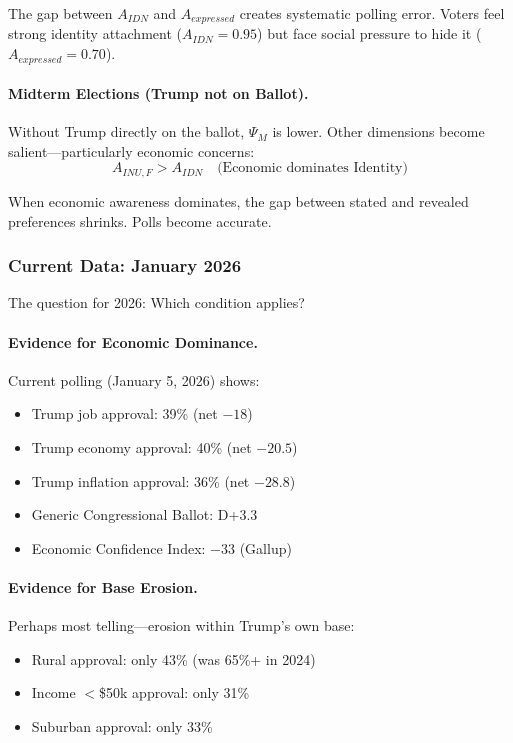The gap between $A_{IDN}$ and $A_{expressed}$ creates systematic polling 
error. Voters feel strong identity attachment ($A_{IDN} = 0.95$) but face 
social pressure to hide it ($A_{expressed} = 0.70$).

\paragraph{Midterm Elections (Trump not on Ballot).}
Without Trump directly on the ballot, $\Psi_M$ is lower. Other dimensions 
become salient---particularly economic concerns:
\begin{equation}
A_{INU,F} > A_{IDN} \quad \text{(Economic dominates Identity)}
\end{equation}

When economic awareness dominates, the gap between stated and revealed 
preferences shrinks. Polls become accurate.

\subsubsection{Current Data: January 2026}

The question for 2026: Which condition applies?

\paragraph{Evidence for Economic Dominance.}
Current polling (January 5, 2026) shows:

\begin{itemize}
    \item Trump job approval: 39\% (net $-18$)
    \item Trump economy approval: 40\% (net $-20.5$)
    \item Trump inflation approval: 36\% (net $-28.8$)
    \item Generic Congressional Ballot: D+3.3
    \item Economic Confidence Index: $-33$ (Gallup)
\end{itemize}

\paragraph{Evidence for Base Erosion.}
Perhaps most telling---erosion within Trump's own base:

\begin{itemize}
    \item Rural approval: only 43\% (was 65\%+ in 2024)
    \item Income $<$\$50k approval: only 31\%
    \item Suburban approval: only 33\%
\end{itemize}

